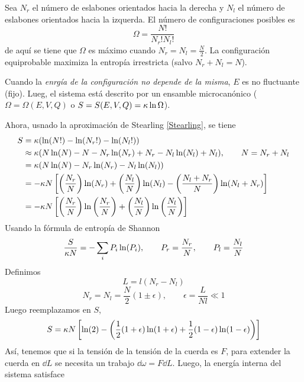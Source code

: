 \begin{sol}
	Sea $N_r$ el número de eslabones orientados hacia la derecha y $N_l$ el número de eslabones orientados hacia la izquerda. El número de configuraciones posibles es
	\begin{equation}
  \Omega=\frac{N!}{N_r!N_l!}
\end{equation}
de aquí se tiene que $\Omega$ es máximo cuando $N_r=N_l=\frac{N}{2}$. La configuración equiprobable maximiza la entropía irrestricta (salvo $N_r+N_l=N$).
\end{sol}

Cuando la \textit{enrgía de la configuración no depende de la misma}, $E$ es no fluctuante (fijo). Lueg, el sistema está descrito por un ensamble microcanónico ($\Omega=\Omega(E,V,Q)$ o $S=S(E,V,Q)=\kappa \ln\Omega$).

Ahora, usnado la aproximación de Stearling \eqref{Stearling}, se tiene
\begin{align}
  S&=\kappa (\ln(N!)-\ln(N_r!)-\ln(N_l!))\\
  &\approx \kappa (N\ln(N)-N-N_r\ln(N_r)+N_r-N_l\ln(N_l)+N_l),\qquad N=N_r+N_l\\
  &=\kappa (N\ln(N)-N_r\ln(N_r)-N_l\ln(N_l))\\
  &=-\kappa N\left[\left(\frac{N_r}{N}\right)\ln(N_r)+\left(\frac{N_l}{N}\right)\ln(N_l)-\left(\frac{N_l+N_r}{N}\right)\ln(N_l+N_r)\right]\\
  &=-\kappa N\left[\left(\frac{N_r}{N}\right)\ln\left(\frac{N_r}{N}\right)+\left(\frac{N_l}{N}\right)\ln\left(\frac{N_l}{N}\right)\right]
\end{align}
Usando la fórmula de entropía de Shannon
\begin{equation}
  \frac{S}{\kappa N}=-\sum_i P_i\ln(P_i),\qquad P_r=\frac{N_r}{N},\qquad P_l=\frac{N_l}{N}
\end{equation}
Definimos 
\begin{equation}
  L=l(N_r-N_l)
\end{equation}
\begin{equation}
  N_r=N_l=\frac{N}{2}(1\pm \epsilon),\qquad \epsilon=\frac{L}{Nl}\ll 1
\end{equation}
Luego reemplazamos en $S$,
\begin{align}
  S=\kappa N\left[\ln(2)-\left(\frac{1}{2}(1+\epsilon)\ln(1+\epsilon)+\frac{1}{2}(1-\epsilon)\ln(1-\epsilon)\right)\right]
\end{align}
Así, tenemos que si la tensión de la tensión de la cuerda es $F$, para extender la cuerda en $\dd L$ se necesita un trabajo $\dd\omega=F\dd L$. Luego, la energía interna del sistema satisface
